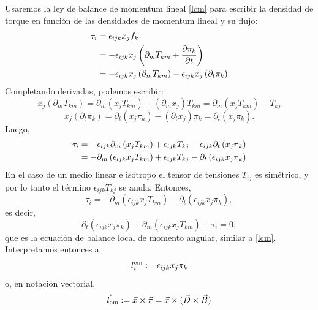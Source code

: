 Usaremos la ley de balance de momentum lineal \eqref{lcm} para escribir la densidad de torque en función de las densidades de momentum lineal y su flujo:
\begin{align}
\tau_i &= \epsilon _{ijk}x_{j}f_{k} \\
&=-\epsilon _{ijk}x_{j}\left( \partial _{m}T_{km}+\frac{\partial \pi _{k}}{%
\partial t}\right)  \\
&=-\epsilon _{ijk}x_{j}\left( \partial _{m}T_{km}\right) -\epsilon
_{ijk}x_{j}\left( \partial _{t}\pi _{k}\right) 
\end{align}%
Completando derivadas, podemos escribir:
\begin{equation}
x_{j}\left( \partial _{m}T_{km}\right)  =\partial _{m}\left(
x_{j}T_{km}\right) -(\partial _{m}x_{j})T_{km} = \partial _{m}\left(
x_{j}T_{km}\right) -T_{kj}
\end{equation}
\begin{equation}
x_{j}\left( \partial _{t}\pi _{k}\right)  =\partial _{t}\left( x_{j}\pi
_{k}\right) -(\partial _{t}x_{j})\pi _{k} = \partial _{t}\left( x_{j}\pi
_{k}\right).
\end{equation}
Luego,%
\begin{align}
\tau_i &= -\epsilon _{ijk}\partial _{m}\left(
x_{j}T_{km}\right) +\epsilon _{ijk}T_{kj}-\epsilon
_{ijk}\partial _{t}\left( x_{j}\pi _{k}\right)   \notag \\
&= -\partial _{m}\left( \epsilon _{ijk}x_{j}T_{km}\right) +\epsilon
_{ijk}T_{kj}-\partial _{t}\left( \epsilon _{ijk}x_{j}\pi _{k}\right) 
\end{align}
En el caso de un medio linear e isótropo el tensor de tensiones $T_{ij}$ es simétrico, y por lo tanto el término $\epsilon_{ijk}T_{kj}$ se anula. Entonces,
\begin{equation}
\tau_i =-\partial _{m}\left( \epsilon
_{ijk}x_{j}T_{km}\right) -\partial _{t}\left( \epsilon _{ijk}x_{j}\pi
_{k}\right) ,
\end{equation}%
es decir,
\begin{equation}
\partial _{t}\left( \epsilon _{ijk}x_{j}\pi_{k}\right) + \partial _{m}\left( \epsilon_{ijk}x_{j}T_{km}\right)+ \tau_i =0,
\end{equation}%
que es la ecuación de balance local de momento angular, similar a \eqref{lcm}. Interpretamos entonces a 
\begin{equation}
l_{i}^{\rm em}:=\epsilon _{ijk}x_{j}\pi_{k}
\end{equation}
o, en notación vectorial,
\begin{equation}
\vec{l}_{\rm em}:=\vec{x}\times\vec{\pi} =\vec{x}\times(\vec{D}\times\vec{B})
\end{equation}
